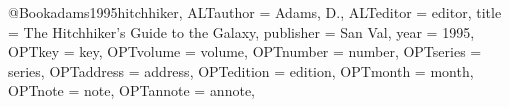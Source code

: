 @Book{adams1995hitchhiker,
	ALTauthor = {Adams, D.},
	ALTeditor = {editor},
	title = {The Hitchhiker's Guide to the Galaxy},
	publisher = {San Val},
	year = {1995},
	OPTkey = {key},
	OPTvolume = {volume},
	OPTnumber = {number},
	OPTseries = {series},
	OPTaddress = {address},
	OPTedition = {edition},
	OPTmonth = {month},
	OPTnote = {note},
	OPTannote = {annote},
}
